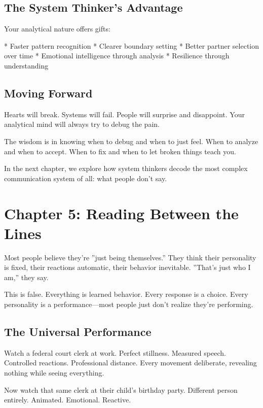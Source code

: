 \documentclass[12pt,oneside]{book}
\begin{document}
\section{The System Thinker's Advantage}

Your analytical nature offers gifts:

                    * Faster pattern recognition
                    * Clearer boundary setting
                    * Better partner selection over time
                    * Emotional intelligence through analysis
                    * Resilience through understanding

\section{Moving Forward}

Hearts will break. Systems will fail. People will surprise and disappoint. Your analytical mind will always try to debug the pain.

The wisdom is in knowing when to debug and when to just feel. When to analyze and when to accept. When to fix and when to let broken things teach you.

In the next chapter, we explore how system thinkers decode the most complex communication system of all: what people don't say.

\chapter{Chapter 5: Reading Between the Lines}

Most people believe they're ''just being themselves.'' They think their personality is fixed, their reactions automatic, their behavior inevitable. ''That's just who I am,'' they say.

This is false. Everything is learned behavior. Every response is a choice. Every personality is a performance---most people just don't realize they're performing.

\section{The Universal Performance}

Watch a federal court clerk at work. Perfect stillness. Measured speech. Controlled reactions. Professional distance. Every movement deliberate, revealing nothing while seeing everything.

Now watch that same clerk at their child's birthday party. Different person entirely. Animated. Emotional. Reactive.
\end{document}
